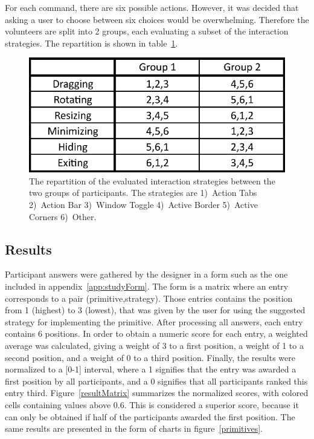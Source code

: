For each command, there are six possible actions.
However, it was decided that asking a user to choose between six choices would be overwhelming.
Therefore the volunteers are split into 2 groups, each evaluating a subset of the interaction strategies.
The repartition is shown in table~\ref{groups}.

\begin{figure}[htb]
  \centering
    \includegraphics[scale=1]{images/groups}
  \caption{The repartition of the evaluated interaction strategies between the two groups of participants. The strategies are 1)~Action Tabs 2)~Action Bar 3)~Window Toggle 4)~Active Border 5)~Active Corners 6)~Other.}
  \label{groups}
\end{figure}


\subsection{Results}

Participant answers were gathered by the designer in a form such as the one included in appendix~\ref{app:studyForm}.
The form is a matrix where an entry corresponds to a pair (primitive,strategy).
Those entries contains the position from 1 (highest) to 3 (lowest), that was given by the user for using the suggested strategy for implementing the primitive.
After processing all answers, each entry contains 6 positions.
In order to obtain a numeric score for each entry, a weighted average was calculated, giving a weight of 3 to a first position, a weight of 1 to a second position, and a weight of 0 to a third position.
Finally, the results were normalized to a [0-1] interval, where a 1 signifies that the entry was awarded a first position by all participants, and a 0 signifies that all participants ranked this entry third.
Figure~\ref{resultMatrix} summarizes the normalized scores, with colored cells containing values above 0.6.
This is considered a superior score, because it can only be obtained if half of the participants awarded the first position.
The same results are presented in the form of charts in figure~\ref{primitives}.

